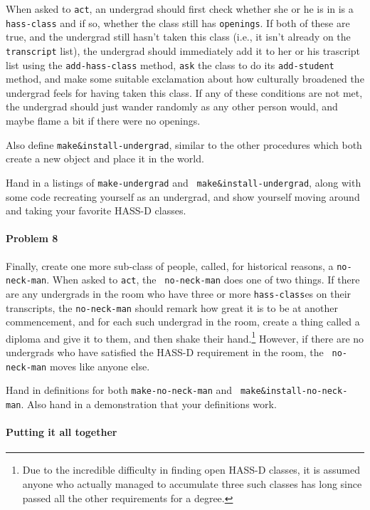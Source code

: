 When asked to {\tt act}, an undergrad should first check whether she
or he is in is a {\tt hass-class} and if so, whether the class still
has {\tt openings}.  If both of these are true, and the undergrad
still hasn't taken this class (i.e., it isn't already on the {\tt
transcript} list), the undergrad should immediately add it to her or
his trascript list using the {\tt add-hass-class} method, {\tt ask}
the class to do its {\tt add-student} method, and make some suitable
exclamation about how culturally broadened the undergrad feels for
having taken this class.  If any of these conditions are not met, the
undergrad should just wander randomly as any other person would, and
maybe flame a bit if there were no openings.

Also define {\tt make\&install-undergrad}, similar to the other
procedures which both create a new object and place it in the world.

Hand in a listings of {\tt make-undergrad} and {\tt
make\&install-undergrad}, along with some code recreating yourself as
an undergrad, and show yourself moving around and taking your favorite
HASS-D classes.


\paragraph{Problem 8}

Finally, create one more sub-class of people, called, for historical
reasons, a {\tt no-neck-man}.  When asked to {\tt act}, the {\tt
no-neck-man} does one of two things.  If there are any undergrads in
the room who have three or more {\tt hass-class}es on their
transcripts, the {\tt no-neck-man} should remark how great it is to be
at another commencement, and for each such undergrad in the room,
create a thing called a diploma and give it to them, and then shake
their hand.\footnote{Due to the incredible difficulty in finding open
HASS-D classes, it is assumed anyone who actually managed to
accumulate three such classes has long since passed all the other
requirements for a degree.} However, if there are no undergrads who
have satisfied the HASS-D requirement in the room, the {\tt
no-neck-man} moves like anyone else.

Hand in definitions for both {\tt make-no-neck-man} and {\tt
make\&install-no-neck-man}.  Also hand in a demonstration that your
definitions work.

\paragraph{Putting it all together}

